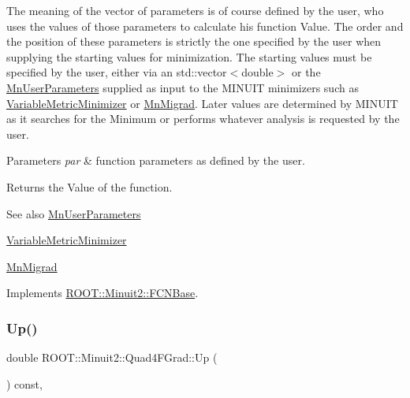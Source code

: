 The meaning of the vector of parameters is of course defined by the user, who uses the values of those parameters to calculate his function Value. The order and the position of these parameters is strictly the one specified by the user when supplying the starting values for minimization. The starting values must be specified by the user, either via an std\+::vector$<$double$>$ or the \mbox{\hyperlink{classROOT_1_1Minuit2_1_1MnUserParameters}{Mn\+User\+Parameters}} supplied as input to the M\+I\+N\+U\+IT minimizers such as \mbox{\hyperlink{classROOT_1_1Minuit2_1_1VariableMetricMinimizer}{Variable\+Metric\+Minimizer}} or \mbox{\hyperlink{classROOT_1_1Minuit2_1_1MnMigrad}{Mn\+Migrad}}. Later values are determined by M\+I\+N\+U\+IT as it searches for the Minimum or performs whatever analysis is requested by the user.


\begin{DoxyParams}{Parameters}
{\em par} & function parameters as defined by the user.\\
\hline
\end{DoxyParams}
\begin{DoxyReturn}{Returns}
the Value of the function.
\end{DoxyReturn}
\begin{DoxySeeAlso}{See also}
\mbox{\hyperlink{classROOT_1_1Minuit2_1_1MnUserParameters}{Mn\+User\+Parameters}} 

\mbox{\hyperlink{classROOT_1_1Minuit2_1_1VariableMetricMinimizer}{Variable\+Metric\+Minimizer}} 

\mbox{\hyperlink{classROOT_1_1Minuit2_1_1MnMigrad}{Mn\+Migrad}} 
\end{DoxySeeAlso}


Implements \mbox{\hyperlink{classROOT_1_1Minuit2_1_1FCNBase_ae4a86bd94d0d0f5ca6fc8f8ab2bb43cd}{R\+O\+O\+T\+::\+Minuit2\+::\+F\+C\+N\+Base}}.

\mbox{\label{classROOT_1_1Minuit2_1_1Quad4FGrad_a0c477f97bac7a89bea6bdea9fdae92cf}} 
\subsubsection{\texorpdfstring{Up()}{Up()}}
{\footnotesize\ttfamily double R\+O\+O\+T\+::\+Minuit2\+::\+Quad4\+F\+Grad\+::\+Up (\begin{DoxyParamCaption}{ }\end{DoxyParamCaption}) const\hspace{0.3cm}{\ttfamily [inline]}, {\ttfamily [virtual]}}

